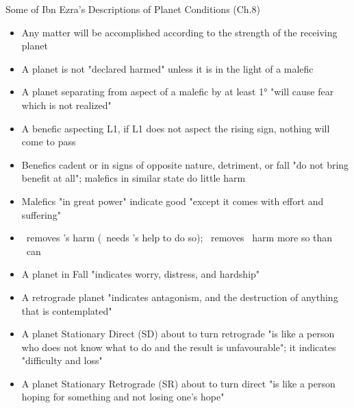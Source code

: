 \begin{frame}[t]{Some of Ibn Ezra's Descriptions of Planet Conditions (Ch.8)}
\footnotesize
\begin{itemize}
\item Any matter will be accomplished according to the strength of the receiving planet
\item A planet is not "declared harmed" unless it is in the light of a malefic
\item A planet separating from aspect of a malefic by at least 1° "will cause fear which is not realized"
\item A benefic aspecting L1, if L1 does not aspect the rising sign, nothing will come to pass
\item Benefics cadent or in signs of opposite nature, detriment, or fall "do not bring benefit at all"; malefics in similar state do little harm
\item Malefics "in great power"  indicate good "except it comes with effort and suffering"
\item \Jupiter\ removes \Saturn's harm (\Venus\ needs \Jupiter's help to do so);  \Venus\ removes \Mars\ harm more so than \Jupiter\ can
\item A planet in Fall "indicates worry, distress, and hardship"
\item A retrograde planet "indicates antagonism, and the destruction of anything that is contemplated"
\item A planet Stationary Direct (SD) about to turn retrograde "is like a person who does not know what to do and the result is unfavourable"; it indicates "difficulty and loss"
\item A planet Stationary Retrograde (SR) about to turn direct "is like a person hoping for something and not losing one's hope"
\end{itemize}
\end{frame}
